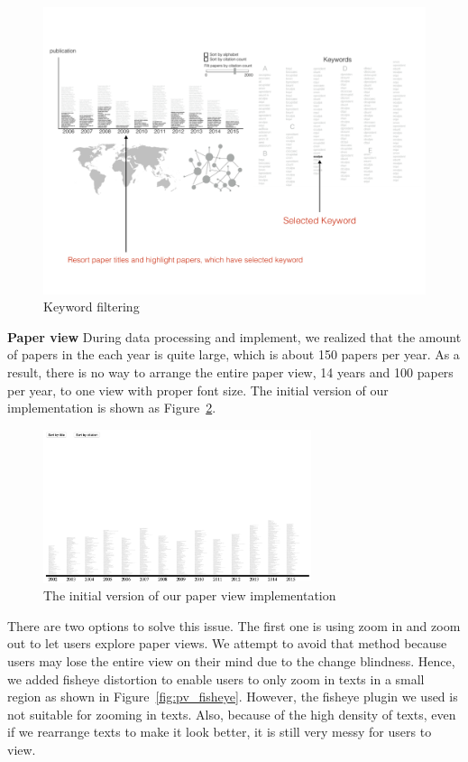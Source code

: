 \begin{figure}[htb!]
    \centering
    \includegraphics[width=160mm]{visproposalDrawing_page_Part_4.pdf}
    \caption{Keyword filtering}
    \label{fig:click_keyword}
\end{figure}

\textbf{Paper view}
During data processing and implement, we realized that the amount of papers in the each year is quite large, which is about 150 papers per year. As a result, there is no way to arrange the entire paper view, 14 years and 100 papers per year, to one view with proper font size. The initial version of our implementation is shown as Figure~\ref{fig:pv_initial_version}.

\begin{figure}[h]			
	\centering
	\includegraphics[width=0.7\textwidth]{paper_view_initial_version}
	\caption{The initial version of our paper view implementation}
	\label{fig:pv_initial_version}
\end{figure} 

There are two options to solve this issue. The first one is using zoom in and zoom out to let users explore paper views. We attempt to avoid that method because users may lose the entire view on their mind due to the change blindness. Hence, we added fisheye distortion to enable users to only zoom in texts in a small region as shown in Figure~\ref{fig:pv_fisheye}. However, the fisheye plugin we used is not suitable for zooming in texts. Also, because of the high density of texts, even if we rearrange texts to make it look better, it is still very messy for users to view.

